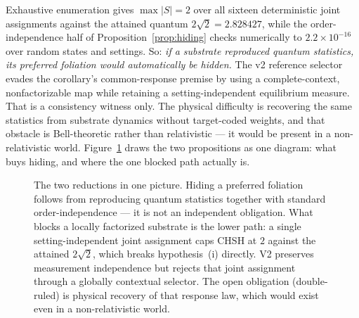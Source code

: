 \documentclass[11pt,a4paper]{article}
\newcommand{\figsub}{\scriptsize}
\theoremstyle{definition}
\theoremstyle{plain}
\theoremstyle{remark}
\begin{document}
\noindent Exhaustive enumeration gives $\max|S| = 2$ over all sixteen
deterministic joint assignments against the attained quantum
$2\sqrt2 = 2.828427$, while the order-independence half of
Proposition~\ref{prop:hiding} checks numerically to $2.2\times10^{-16}$
over random states and settings. So: \emph{if a substrate reproduced
quantum statistics, its preferred foliation would automatically be
hidden.} The v2 reference selector evades the corollary's common-response
premise by using a complete-context, nonfactorizable map while retaining a
setting-independent equilibrium measure. That is a consistency witness only.
The physical difficulty is recovering the same statistics from substrate
dynamics without target-coded weights, and that obstacle is Bell-theoretic
rather than relativistic --- it would be present in a non-relativistic world.
Figure~\ref{fig:reductions} draws the two propositions as one diagram:
what buys hiding, and where the one blocked path actually is.

\begin{figure}[t]
\centering
{}
\caption{The two reductions in one picture. Hiding a preferred foliation
follows from reproducing quantum statistics together with standard
order-independence --- it is not an independent obligation. What blocks a
locally factorized substrate is the lower path: a single setting-independent
joint assignment caps CHSH at $2$ against the attained $2\sqrt2$, which
breaks hypothesis~(i) directly. V2 preserves measurement independence but
rejects that joint assignment through a globally contextual selector. The
open obligation (double-ruled) is physical recovery of that response law,
which would exist even in a non-relativistic world.}
\label{fig:reductions}
\end{figure}
\end{document}

